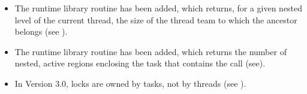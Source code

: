 \begin{itemize}
\item The  runtime library routine has been added, which returns,
for a given nested level of the current thread, the size of the thread team to which the
ancestor belongs (see
).

\item The  runtime library routine has been added, which
returns the number of nested, active  regions enclosing the task that
contains the call (see\linebreak {}).

\item In Version 3.0, locks are owned by tasks, not by threads (see
).
\end{itemize}



